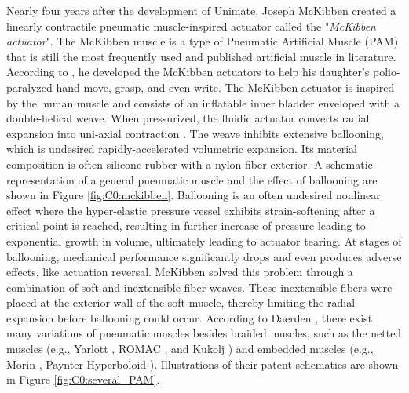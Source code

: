 Nearly four years after the development of Unimate, Joseph McKibben created a linearly contractile pneumatic muscle-inspired actuator called the "\emph{McKibben actuator}". The McKibben muscle is a type of Pneumatic Artificial Muscle (PAM) that is still the most frequently used and published artificial muscle in literature. According to \cite{Mckibben}, he developed the McKibben actuators to help his daughter's polio-paralyzed hand move, grasp, and even write. The McKibben actuator is inspired by the human muscle and consists of an inflatable inner bladder enveloped with a double-helical weave. When pressurized, the fluidic actuator converts radial expansion into uni-axial contraction \cite{Daerden1999,Daerden2000,Schulte1961}. The weave inhibits extensive ballooning, which is undesired rapidly-accelerated volumetric expansion. Its material composition is often silicone rubber with a nylon-fiber exterior. A schematic representation of a general pneumatic muscle and the effect of ballooning are shown in Figure \ref{fig:C0:mckibben}. Ballooning is an often undesired nonlinear effect where the hyper-elastic pressure vessel exhibits strain-softening after a critical point is reached, resulting in further increase of pressure leading to exponential growth in volume, ultimately leading to actuator tearing. At stages of ballooning, mechanical performance significantly drops and even produces adverse effects, like actuation reversal. McKibben solved this problem through a combination of soft and inextensible fiber weaves. These inextensible fibers were placed at the exterior wall of the soft muscle, thereby limiting the radial expansion before ballooning could occur. According to Daerden \cite{Daerden1999}, there exist many variations of pneumatic muscles besides braided muscles, such as the netted muscles (e.g., Yarlott \cite{Yarlott1972}, ROMAC \cite{Immega1986}, and Kukolj \cite{Kukolj1988}) and embedded muscles (e.g., Morin \cite{Morin1953}, Paynter Hyperboloid \cite{Paynter1988}). Illustrations of their patent schematics are shown in Figure \ref{fig:C0:several_PAM}.

